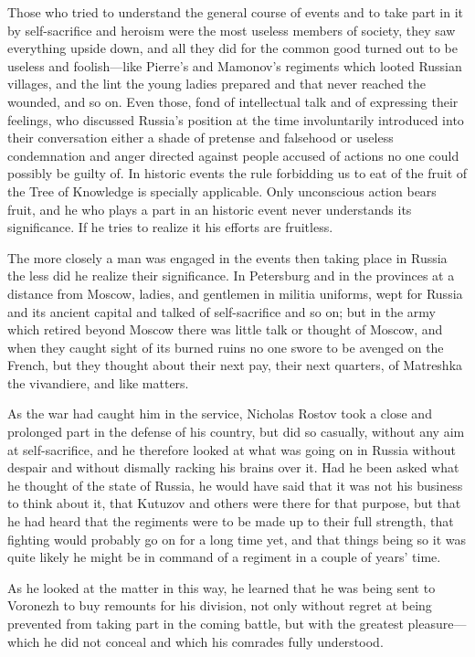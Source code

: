 Those who tried to understand the general course of events and to
take part in it by self-sacrifice and heroism were the most
useless members of society, they saw everything upside down, and
all they did for the common good turned out to be useless and
foolish---like Pierre's and Mamonov's regiments which looted
Russian villages, and the lint the young ladies prepared and that
never reached the wounded, and so on.  Even those, fond of
intellectual talk and of expressing their feelings, who discussed
Russia's position at the time involuntarily introduced into their
conversation either a shade of pretense and falsehood or useless
condemnation and anger directed against people accused of actions
no one could possibly be guilty of. In historic events the rule
forbidding us to eat of the fruit of the Tree of Knowledge is
specially applicable. Only unconscious action bears fruit, and he
who plays a part in an historic event never understands its
significance. If he tries to realize it his efforts are
fruitless.

The more closely a man was engaged in the events then taking
place in Russia the less did he realize their significance. In
Petersburg and in the provinces at a distance from Moscow,
ladies, and gentlemen in militia uniforms, wept for Russia and
its ancient capital and talked of self-sacrifice and so on; but
in the army which retired beyond Moscow there was little talk or
thought of Moscow, and when they caught sight of its burned ruins
no one swore to be avenged on the French, but they thought about
their next pay, their next quarters, of Matreshka the vivandiere,
and like matters.

As the war had caught him in the service, Nicholas Rostov took a
close and prolonged part in the defense of his country, but did
so casually, without any aim at self-sacrifice, and he therefore
looked at what was going on in Russia without despair and without
dismally racking his brains over it. Had he been asked what he
thought of the state of Russia, he would have said that it was
not his business to think about it, that Kutuzov and others were
there for that purpose, but that he had heard that the regiments
were to be made up to their full strength, that fighting would
probably go on for a long time yet, and that things being so it
was quite likely he might be in command of a regiment in a couple
of years' time.

As he looked at the matter in this way, he learned that he was
being sent to Voronezh to buy remounts for his division, not only
without regret at being prevented from taking part in the coming
battle, but with the greatest pleasure---which he did not conceal
and which his comrades fully understood.

